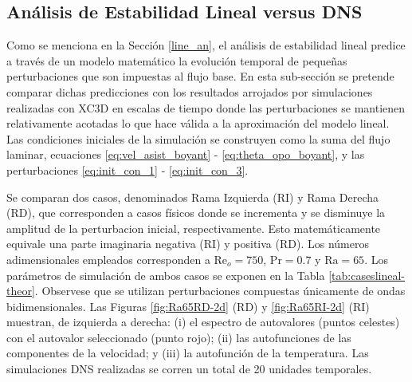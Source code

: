 \subsection{Análisis de Estabilidad Lineal versus DNS}

Como se menciona en la Sección \ref{line_an}, el análisis de estabilidad lineal predice a través de un modelo matemático la evolución temporal de pequeñas perturbaciones que son impuestas al flujo base. En esta sub-sección se pretende comparar dichas predicciones con los resultados arrojados por simulaciones realizadas con XC3D en escalas de tiempo donde las perturbaciones se mantienen relativamente acotadas lo que hace válida a la aproximación del modelo lineal. Las condiciones iniciales de la simulación se construyen como la suma del flujo laminar, ecuaciones \ref{eq:vel_asist_boyant} - \ref{eq:theta_opo_boyant}, y las perturbaciones \ref{eq:init_con_1} - \ref{eq:init_con_3}. 

Se comparan dos casos, denominados Rama Izquierda (RI) y Rama Derecha (RD), que corresponden a casos físicos donde se incrementa y se disminuye la amplitud de la perturbacion inicial, respectivamente. Esto matemáticamente equivale una parte imaginaria negativa (RI) y positiva (RD). Los números adimensionales empleados corresponden a $\text{Re}_o=750$, $\text{Pr}=0\text{.}7$ y $\text{Ra}=65$. Los parámetros de simulación de ambos casos se exponen en la Tabla \ref{tab:caseslineal-theor}. Observese que se utilizan perturbaciones compuestas únicamente de ondas bidimensionales. Las Figuras \ref{fig:Ra65RD-2d} (RD) y \ref{fig:Ra65RI-2d} (RI) muestran, de izquierda a derecha: (i) el espectro de autovalores (puntos celestes) con el autovalor seleccionado (punto rojo); (ii) las autofunciones de las componentes de la velocidad; y (iii) la autofunción de la temperatura. Las simulaciones DNS realizadas se corren un total de 20 unidades temporales.

\begin{table}[H]
\centering
{}
\caption{Parámetros de simulación de los dos casos elegidos.}
\label{tab:caseslineal-theor}
\end{table}


